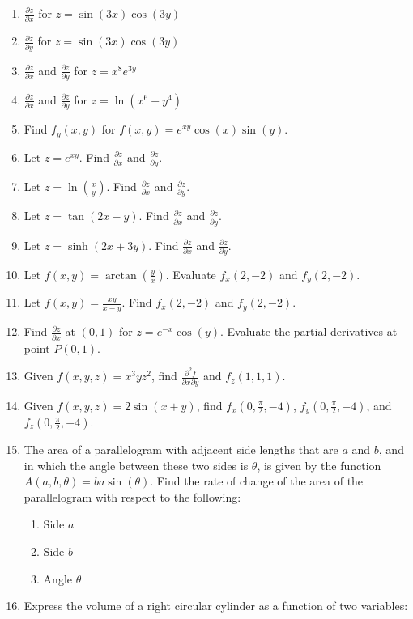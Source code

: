 \documentclass{exercises}
\begin{document}
\begin{enumerate}[resume]
\item $\frac{\partial z}{\partial x}$ for $z=\sin(3x)\cos(3y)$
\item $\frac{\partial z}{\partial y}$ for $z=\sin(3x)\cos(3y)$
\item $\frac{\partial z}{\partial x}$ and $\frac{\partial z}{\partial y}$ for $z=x^{8}e^{3y}$
\item $\frac{\partial z}{\partial x}$ and $\frac{\partial z}{\partial y}$ for $z=\ln(x^{6}+y^{4})$
\item Find $f_{y}(x,y)$ for $f(x,y)=e^{xy}\cos(x)\sin(y)$.
\item Let $z=e^{xy}$. Find $\frac{\partial z}{\partial x}$ and $\frac{\partial z}{\partial y}$.
\item Let $z=\ln(\frac{x}{y})$. Find $\frac{\partial z}{\partial x}$ and $\frac{\partial z}{\partial y}$.
\item Let $z=\tan(2x-y)$. Find $\frac{\partial z}{\partial x}$ and $\frac{\partial z}{\partial y}$.
\item Let $z=\sinh(2x+3y)$. Find $\frac{\partial z}{\partial x}$ and $\frac{\partial z}{\partial y}$.
\item Let $f(x,y)=\arctan(\frac{y}{x})$. Evaluate $f_{x}(2,-2)$ and $f_{y}(2,-2)$.
\item Let $f(x,y)=\frac{xy}{x-y}$. Find $f_{x}(2,-2)$ and $f_{y}(2,-2)$.
\item Find $\frac{\partial z}{\partial x}$ at $(0,1)$ for $z=e^{-x}\cos(y)$. Evaluate the partial derivatives at point $P(0,1)$.
\item Given $f(x,y,z)=x^{3}yz^{2}$, find $\frac{\partial^{2}f}{\partial x\partial y}$ and $f_{z}(1,1,1)$.
\item Given $f(x,y,z)=2\sin(x+y)$, find $f_{x}(0,\frac{\pi}{2},-4)$, $f_{y}(0,\frac{\pi}{2},-4)$, and $f_{z}(0,\frac{\pi}{2},-4)$.
\item The area of a parallelogram with adjacent side lengths that are $a$ and $b$, and in which the angle between these two sides is $\theta$, is given by the function $A(a,b,\theta)=ba\sin(\theta)$. Find the rate of change of the area of the parallelogram with respect to the following:
\begin{enumerate}[label=(\alph*)]
  \item Side $a$
  \item Side $b$
  \item Angle $\theta$
\end{enumerate}
\item Express the volume of a right circular cylinder as a function of two variables:

\end{enumerate}
\end{document}
